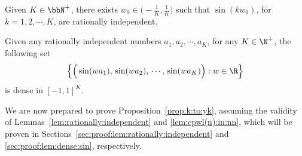 \documentclass[11pt,a4paper]{article}
\begin{document}
\begin{lemma}
    \label{lem:rationally:independent}
	Given $K\in\bbN^+$, there exists $w_0\in \big(-\tfrac{1}{K}, \tfrac{1}{K}\big)$ such that $\sin (k w_0  )$, for $k=1,2,\cdots,K$, are rationally independent.
\end{lemma}

\begin{lemma}\label{lem:dense:sin}
	Given any rationally independent numbers $a_1,a_2,\cdots,a_K$, for any $K\in\N^+$, the following set 
	\begin{equation*}
		\Big\{\Big(\sin(wa_1),\, \sin(wa_2),\, \cdots,\,\sin(wa_K)\Big) : w\in\R
		\Big\}
	\end{equation*}
is dense in $[-1,1]^K$.
\end{lemma}


We are now prepared to prove Proposition~\ref{prop:k:to:yk}, assuming the validity of Lemmas~\ref{lem:rationally:independent} and \ref{lem:cpwl(n):in:nn}, which will be proven in Sections~\ref{sec:proof:lem:rationally:independent} and \ref{sec:proof:lem:dense:sin}, respectively.
\end{document}
